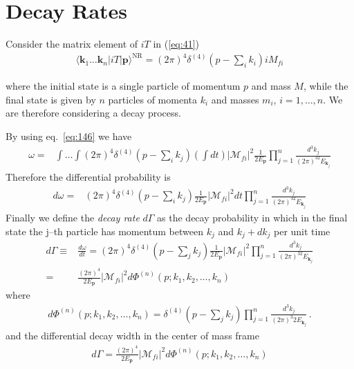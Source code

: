 \section{Decay Rates}
\label{sec:decay-rates}
Consider the matrix element of $i T$ in (\ref{eq:41})
\begin{align}
  \label{eq:45}
  \langle\mathbf{k}_1\ldots\mathbf{k}_n|i T|\mathbf{p}\rangle^{\text{NR}}=(2\pi)^4\delta^{(4)}\left(p-\sum_i k_i\right)i{M}_{fi}
\end{align}

where the initial state is a single particle of momentum $p$ and mass $M$, while the final state is given by $n$ particles of momenta $k_i$ and masses $m_i$, $i=1,\ldots,n$. 
We are therefore considering a decay process. 


By using eq.~\eqref{eq:146} we have
\begin{align}
\omega=&\int\ldots\int 
(2\pi)^4\delta^{(4)}\left(p-\sum_i k_j\right)\left(\int dt\right) 
\left|\mathcal{M}_{fi}\right|^2
\frac{1}{2E_{\mathbf{p}}}
\prod_{j=1}^n\frac{d^3k_j}{(2\pi)^32E_{\mathbf{k}_j}}
\end{align}
Therefore the differential probability is
\begin{align}
  d\omega=&
(2\pi)^4\delta^{(4)}\left(p-\sum_i k_j\right)
\frac{1}{2E_{\mathbf{p}}}\left|\mathcal{M}_{fi}\right|^2
dt\prod_{j=1}^n\frac{d^3k_j}{(2\pi)^32E_{\mathbf{k}_j}}
\end{align}
Finally we define the \textit{decay rate} $d\Gamma$ as the decay probability in which in the final state
the j--th particle has momentum between $k_j$ and $k_j+ dk_j$ per unit time
\begin{align}
\label{eq:49}
d\Gamma\equiv&\frac{d\omega}{dt}=
(2\pi)^4\delta^{(4)}\left(p-\sum_j k_j\right)
\frac{1}{2E_{\mathbf{p}}}\left|\mathcal{M}_{fi}\right|^2
\prod_{j=1}^n\frac{d^3k_j}{(2\pi)^32E_{\mathbf{k}_j}}\nonumber\\
=&\frac{(2\pi)^4}{2E_{\mathbf{p}}}\left|\mathcal{M}_{fi}\right|^2
d \Phi^{(n)} (p; k_1, k_2,\dots, k_n)
\end{align}
where
\begin{align}
  \label{eq:50}
    d \Phi^{(n)} (p; k_1, k_2,\dots, k_n) = \delta^{(4)}\left(p-\sum_j k_j\right)  \prod_{j=1}^n \frac{d^3 k_j}{(2\pi)^3 2 E_{\mathbf{k}_j}} \,.
\end{align}
and the differential decay width in the center of mass frame
\begin{align}
  \label{eq:51}
  d\Gamma=\frac{(2\pi)^4}{2E_{\mathbf{p}}}\left|\mathcal{M}_{fi}\right|^2
d \Phi^{(n)} (p; k_1, k_2,\dots, k_n)
\end{align}


